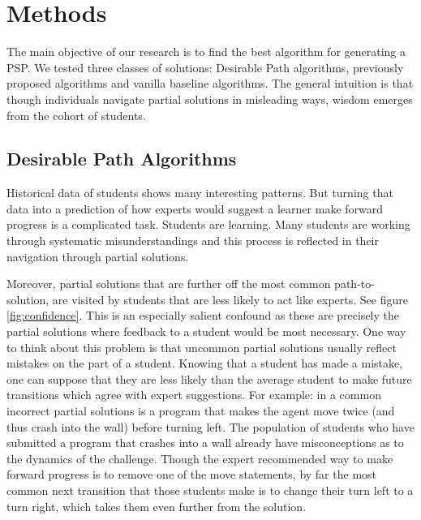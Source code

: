 \section{Methods}

The main objective of our research is to find the best algorithm for generating a PSP. We tested three classes of solutions: Desirable Path algorithms, previously proposed algorithms and vanilla baseline algorithms. The general intuition is that though individuals navigate partial solutions in misleading ways, wisdom emerges from the cohort of students.

\subsection{Desirable Path Algorithms}

Historical data of students shows many interesting patterns.
But turning that data into a prediction of how experts would suggest a learner make forward progress is a complicated task. Students are learning. Many students are working through systematic misunderstandings and this process is reflected in their navigation through partial solutions. 



Moreover, partial solutions that are further off the most common path-to-solution, are visited by students that are less likely to act like experts. See figure \ref{fig:confidence}. This is an especially salient confound as these are precisely the partial solutions where feedback to a student would be most necessary. One way to think about this problem is that uncommon partial solutions usually reflect mistakes on the part of a student. Knowing that a student has made a mistake, one can suppose that they are less likely than the average student to make future transitions which agree with expert suggestions. For example: in \Pa    a common incorrect partial solutions is a program that makes the agent move twice (and thus crash into the wall) before turning left. The population of students who have submitted a program that crashes into a wall already have misconceptions as to the dynamics of the challenge. Though the expert recommended way to make forward progress is to remove one of the move statements, by far the most common next transition that those students make is to change their turn left to a turn right, which takes them even further from the solution.


